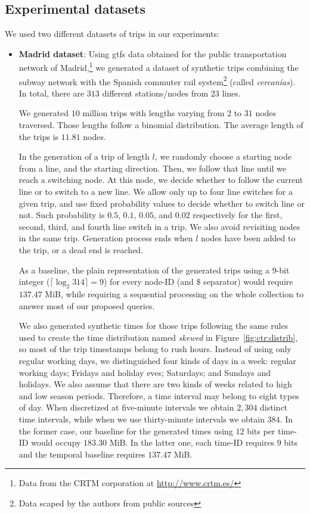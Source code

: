 	\subsection{Experimental datasets}
	\label{sec:ctr:exp:data}
	We used two different datasets of trips in our experiments:
	\begin{itemize}
	
	  \item {\bf Madrid dataset}:
	  Using \gls{gtfs} data obtained for the public transportation network of 
	  {Madrid},\footnote{Data from
	  the CRTM corporation at \url{http://www.crtm.es/}} we generated a dataset of 
	  synthetic trips combining the subway network with the Spanish commuter rail system\footnote{Data scaped by the authors from public sources} (called {\em cercanías}).
	  In total, there are $313$ different stations/nodes from $23$ lines.
	 
	We generated $10$ million trips with lengths varying from $2$ to $31$ nodes traversed. Those lengths follow a binomial 
	distribution. The average length of the trips is $11.81$ nodes. 
	
	In the generation of a trip of length $l$, we randomly choose a starting node from a line, and the starting direction. 
	Then, we follow that line until we reach a switching node. At this node, we decide whether to follow the current 
	line or to switch to a new line. We allow only up to four line switches for a given trip, and use fixed probability 
	values to decide whether to switch line or not. Such probability is $0.5$, $0.1$, $0.05$, and $0.02$ respectively 
	for the first, second, third, and fourth line switch in a trip. 
	We also avoid revisiting nodes in the same trip. 
	Generation process ends when $l$ nodes have been added to the trip, or a dead end is reached.

	As a baseline, the plain representation of the generated trips using a $9$-bit integer ($\lceil\log_2 314\rceil= 9$) 
	for every node-ID (and $\$$ separator) would require $137.47$ MiB, while requiring a sequential processing on the whole collection to answer most of our proposed queries.
	 
	We also generated synthetic times for those trips following the same rules used to create the time distribution
	named \textit{skewed} in Figure~\ref{fig:ctr:distrib}, so most of the trip timestamps belong to rush hours. 
	Instead of using only regular working days, we distinguished four kinds of days in a week:
	regular working days; Fridays and holiday eves; Saturdays; and Sundays and holidays. We also 
	assume that there are two kinds of weeks related to high and low season periods. 
	Therefore, a time interval may belong to eight types of day. 
	When discretized at five-minute intervals we obtain $2,\!304$ distinct time intervals, 
	while when we use thirty-minute intervals we obtain $384$. In the former case, our  baseline
	 for the generated times using  $12$ bits per time-ID would occupy $183.30$ MiB. In the latter one, each time-ID requires  $9$ bits and the  temporal baseline requires $137.47$ MiB.
	 

\end{itemize}
